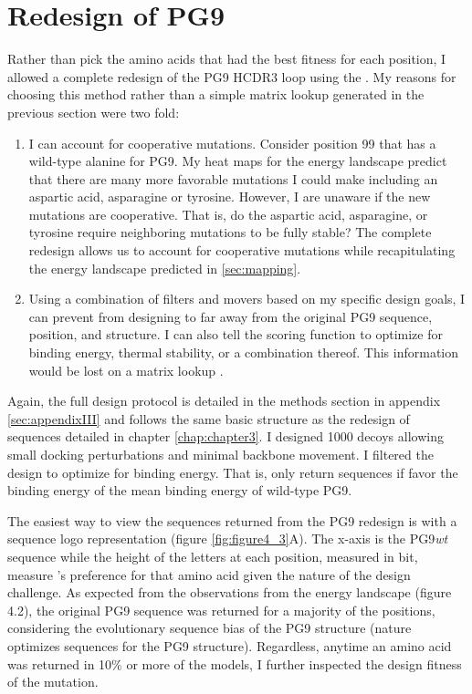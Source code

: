 \section{Redesign of PG9}
Rather than pick the amino acids that had the best fitness for each position, I allowed a complete redesign of the PG9 HCDR3 loop using the \rosettadesign. My reasons for choosing this method rather than a simple matrix lookup generated in the previous section were two fold:
\begin{enumerate}
\item I can account for cooperative mutations. Consider position 99 that has a wild-type alanine for PG9. My heat maps for the energy landscape predict that there are many more favorable mutations I could make including an aspartic acid, asparagine or tyrosine. However, I are unaware if the new mutations are cooperative. That is, do the aspartic acid, asparagine, or tyrosine require neighboring mutations to be fully stable? The complete redesign allows us to account for cooperative mutations while recapitulating the energy landscape predicted in \ref{sec:mapping}.
\item Using a combination of filters and movers based on my specific design goals, I can prevent \rosetta from designing to far away from the original PG9 sequence, position, and structure. I can also tell the \rosetta scoring function to optimize for binding energy, thermal stability, or a combination thereof. This information would be lost on a matrix lookup \citep{Fleishman:2011ji,Kaufmann:2010ea,Kuhlman:2000tc}.
\end{enumerate}

Again, the full design protocol is detailed in the methods section in appendix \ref{sec:appendixIII} and follows the same basic structure as the redesign of sequences detailed in chapter \ref{chap:chapter3}. I designed 1000 decoys allowing small docking perturbations and minimal backbone movement. I filtered the design to optimize for binding energy. That is, only return sequences if favor the binding energy of the mean binding energy of wild-type PG9.

The easiest way to view the sequences returned from the PG9 redesign is with a sequence logo representation (figure \ref{fig:figure4_3}A). The x-axis is the PG9\textit{wt} sequence while the height of the letters at each position, measured in bit, measure \rosetta's preference for that amino acid given the nature of the design challenge. As expected from the observations from the energy landscape (figure 4.2), the original PG9 sequence was returned for a majority of the positions, considering the evolutionary sequence bias of the PG9 structure (nature optimizes sequences for the PG9 structure).  Regardless, anytime an amino acid was returned in 10\% or more of the models, I further inspected the design fitness of the mutation.

